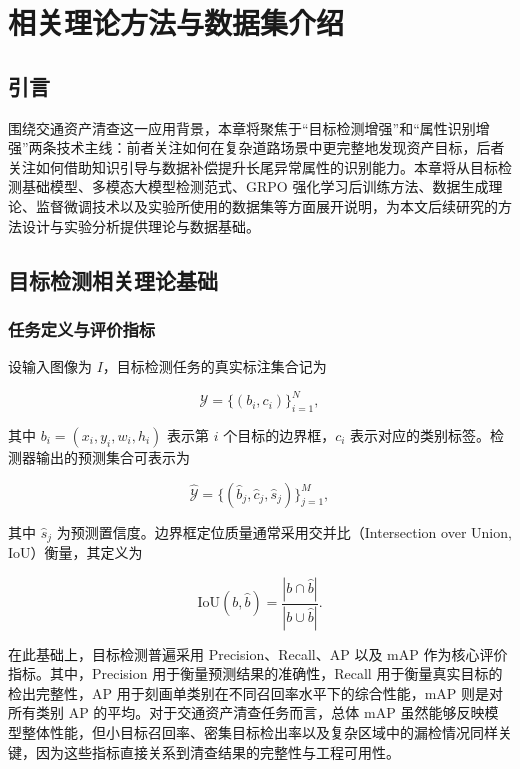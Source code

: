 

\chapter{相关理论方法与数据集介绍}

\label{chap:related_theory}

\section{引言}

围绕交通资产清查这一应用背景，本章将聚焦于“目标检测增强”和“属性识别增强”两条技术主线：前者关注如何在复杂道路场景中更完整地发现资产目标，后者关注如何借助知识引导与数据补偿提升长尾异常属性的识别能力。本章将从目标检测基础模型、多模态大模型检测范式、GRPO 强化学习后训练方法、数据生成理论、监督微调技术以及实验所使用的数据集等方面展开说明，为本文后续研究的方法设计与实验分析提供理论与数据基础。

\section{目标检测相关理论基础}

\subsection{任务定义与评价指标}

设输入图像为 $I$，目标检测任务的真实标注集合记为

\begin{equation}
\mathcal{Y}=\{(b_i,c_i)\}_{i=1}^{N},
\end{equation}

其中 $b_i=(x_i,y_i,w_i,h_i)$ 表示第 $i$ 个目标的边界框，$c_i$ 表示对应的类别标签。检测器输出的预测集合可表示为

\begin{equation}
\hat{\mathcal{Y}}=\{(\hat b_j,\hat c_j,\hat s_j)\}_{j=1}^{M},
\end{equation}

其中 $\hat s_j$ 为预测置信度。边界框定位质量通常采用交并比（Intersection over Union, IoU）衡量，其定义为

\begin{equation}
\mathrm{IoU}(b,\hat b)=\frac{|b\cap \hat b|}{|b\cup \hat b|}.
\end{equation}

在此基础上，目标检测普遍采用 Precision、Recall、AP 以及 mAP 作为核心评价指标。其中，Precision 用于衡量预测结果的准确性，Recall 用于衡量真实目标的检出完整性，AP 用于刻画单类别在不同召回率水平下的综合性能，mAP 则是对所有类别 AP 的平均。对于交通资产清查任务而言，总体 mAP 虽然能够反映模型整体性能，但小目标召回率、密集目标检出率以及复杂区域中的漏检情况同样关键，因为这些指标直接关系到清查结果的完整性与工程可用性。

